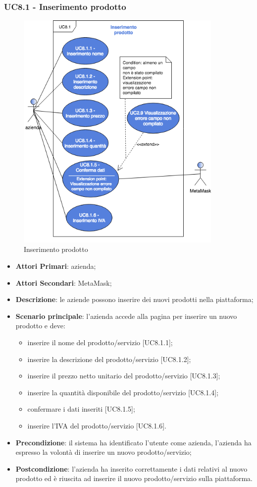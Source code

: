\subsubsection{UC8.1 - Inserimento prodotto}
\begin{figure}[H]
	\includegraphics[width=10cm]{res/images/UC8-Inserimento.png}
	\centering
	\caption{Inserimento prodotto}
\end{figure}
\begin{itemize}
	\item \textbf{Attori Primari}: azienda;
	\item \textbf{Attori Secondari}: MetaMask\glo;
	\item \textbf{Descrizione}: le aziende possono inserire dei nuovi prodotti nella piattaforma;
	\item \textbf{Scenario principale}: l'azienda accede alla pagina per inserire un nuovo prodotto e deve:
	\begin{itemize}
		\item inserire il nome del prodotto/servizio [UC8.1.1];
		\item inserire la descrizione del prodotto/servizio [UC8.1.2];
		\item inserire il prezzo netto unitario del prodotto/servizio [UC8.1.3];
		\item inserire la quantità disponibile del prodotto/servizio [UC8.1.4];
		\item confermare i dati inseriti [UC8.1.5];
		\item inserire l'IVA del prodotto/servizio [UC8.1.6].
	\end{itemize}
	\item \textbf{Precondizione}: il sistema ha identificato l'utente come azienda, l'azienda ha espresso la volontà di inserire un nuovo prodotto/servizio;
	\item \textbf{Postcondizione}: l'azienda ha inserito correttamente i dati relativi al nuovo prodotto ed è riuscita ad inserire il nuovo prodotto/servizio sulla piattaforma.	
\end{itemize}
